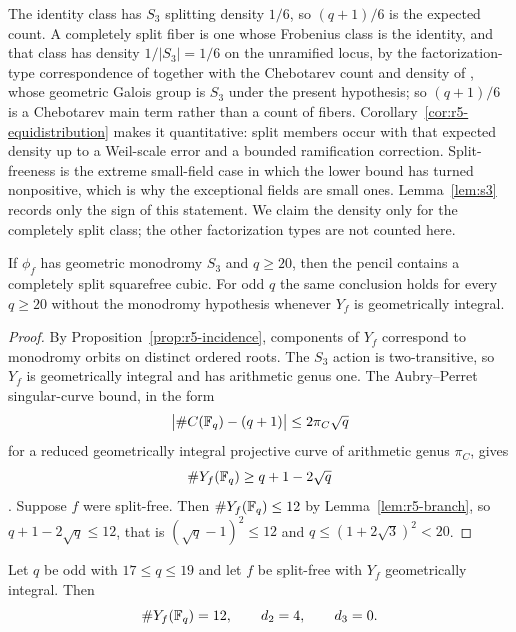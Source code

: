 The identity class has $S_3$ splitting density $1/6$, so $(q+1)/6$ is
the expected count.  A completely split fiber is one whose Frobenius
class is the identity, and that class has density $1/|S_3|=1/6$ on the
unramified locus, by the
factorization-type correspondence of \cite[Thm.~3.6]{Wang2026} together
with the Chebotarev count and density of
\cite[Thm.~3.7 and Cor.~3.8]{Wang2026}, whose geometric Galois group is
$S_3$ under the present hypothesis; so
$(q+1)/6$ is a Chebotarev main term rather than a count of fibers.
Corollary~\ref{cor:r5-equidistribution} makes it quantitative: split
members occur with that expected density up to a Weil-scale error and a
bounded ramification correction.  Split-freeness is the extreme
small-field case in which the lower bound has turned nonpositive, which
is why the exceptional fields are small ones.  Lemma~\ref{lem:s3}
records only the sign of this statement.  We claim the density only for
the completely split class; the other factorization types are not
counted here.

\begin{lemma}[$S_3$ stratum]\label{lem:s3}%
%
%
%
If $\phi_f$ has geometric monodromy $S_3$ and $q\geq20$, then the pencil
contains a completely split squarefree cubic.  For odd $q$ the same
conclusion holds for every $q\geq20$ without the monodromy hypothesis
whenever $Y_f$ is geometrically integral.
\end{lemma}

\begin{proof}
By Proposition~\ref{prop:r5-incidence}, components of $Y_f$ correspond
to monodromy orbits on distinct ordered roots.  The $S_3$ action is
two-transitive, so $Y_f$ is geometrically integral and has arithmetic
genus one.  The Aubry--Perret singular-curve bound, in the form
\[
 \bigl|\#C(\mathbb F_q)-(q+1)\bigr|\leq 2\pi_C\sqrt q
\]
for a reduced geometrically integral projective curve of arithmetic
genus \(\pi_C\), gives
\[
       \#Y_f(\mathbb F_q)\geq q+1-2\sqrt q
\]
\cite[p.~468]{AubryPerret1995}.  Suppose $f$ were split-free.  Then
$\#Y_f(\mathbb F_q)\leq12$ by Lemma~\ref{lem:r5-branch}, so
$q+1-2\sqrt q\leq12$, that is $(\sqrt q-1)^2\leq12$ and
$q\leq(1+2\sqrt3)^2<20$.
\end{proof}

\begin{corollary}\label{cor:r5-forced}%
%
%
Let $q$ be odd with $17\leq q\leq19$ and let $f$ be split-free with
$Y_f$ geometrically integral.  Then
\[
 \#Y_f(\mathbb F_q)=12,\qquad d_2=4,\qquad d_3=0 .
\]
\end{corollary}

